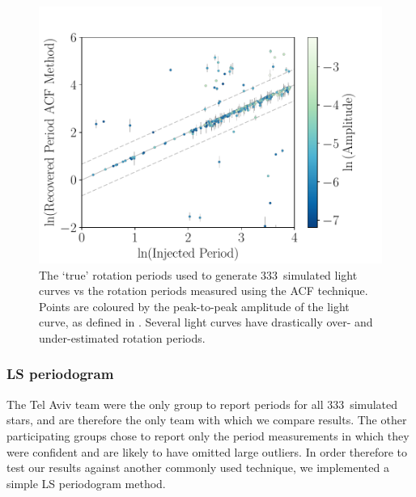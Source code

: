 \documentclass[a4paper,fleqn,usenatbib,useAMS]{mnras}
\newcommand{\naigrain}{333}
\begin{document}
\begin{figure}
\begin{center}
\includegraphics[width=6in, clip=true]{figures/compare_acf.pdf}
\caption[ACF results.]
{The `true' rotation periods used to generate \naigrain\ simulated light
curves vs the rotation periods measured using the ACF technique.
    Points are coloured by the peak-to-peak amplitude of the light curve, as
    defined in \citet{Aigrain2015}.
    Several light curves have drastically over- and under-estimated rotation
    periods.
    }
\label{fig:compare_acf}
\end{center}
\end{figure}

\subsubsection{LS periodogram}
\label{sec:ls}

The \citet{Aigrain2015} Tel Aviv team were the only group to report periods
for all \naigrain\ simulated stars, and are therefore the only team with which
we compare results.
The other participating groups chose to report only the period measurements in
which they were confident and are likely to have omitted large outliers.
In order therefore to test our results against another commonly used
technique, we implemented a simple LS periodogram method.
\end{document}
